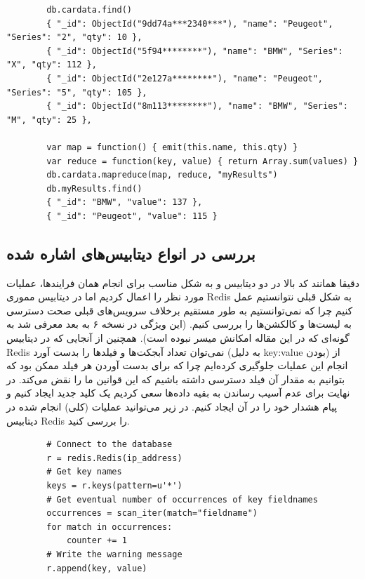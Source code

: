 \documentclass[10pt, a4paper]{article}
\begin{document}
\begin{LTR}
    \begin{lstlisting}
        db.cardata.find()
        { "_id": ObjectId("9dd74a***2340***"), "name": "Peugeot", "Series": "2", "qty": 10 },
        { "_id": ObjectId("5f94********"), "name": "BMW", "Series": "X", "qty": 112 },
        { "_id": ObjectId("2e127a********"), "name": "Peugeot", "Series": "5", "qty": 105 },
        { "_id": ObjectId("8m113********"), "name": "BMW", "Series": "M", "qty": 25 },

        var map = function() { emit(this.name, this.qty) }
        var reduce = function(key, value) { return Array.sum(values) } 
        db.cardata.mapreduce(map, reduce, "myResults")
        db.myResults.find()
        { "_id": "BMW", "value": 137 },
        { "_id": "Peugeot", "value": 115 }
    \end{lstlisting}
\end{LTR}

\subsection*{بررسی در انواع دیتابیس‌های اشاره شده}

دقیقا همانند کد بالا در دو دیتابیس  و  به شکل
مناسب برای انجام همان فرایند‌ها، عملیات مورد نظر را اعمال کردیم اما در دیتابیس
مموری Redis به شکل قبلی نتوانستیم عمل کنیم چرا که نمی‌توانستیم به طور مستقیم
برخلاف سرویس‌های قبلی صحت دسترسی به لیست‌ها و کالکشن‌ها را بررسی کنیم. (این
ویژگی در نسخه ۶ به بعد معرفی شد به گونه‌ای که در این مقاله امکانش میسر نبوده
است). همچنین از آنجایی که در دیتابیس Redis نمی‌توان تعداد آبجکت‌ها و فیلد‌ها را
بدست آورد (به دلیل key:value بودن) از انجام این عملیات جلوگیری کرده‌ایم چرا که
برای بدست آوردن هر فیلد ممکن بود که بتوانیم به مقدار آن فیلد دسترسی داشته باشیم
که این قوانین ما را نقض می‌کند. در نهایت برای عدم آسیب رساندن به بقیه داده‌ها
سعی کردیم یک کلید جدید ایجاد کنیم و پیام هشدار خود را در آن ایجاد کنیم. در زیر
می‌توانید عملیات (کلی) انجام شده در دیتابیس Redis را بررسی کنید.

\begin{LTR}
    \begin{lstlisting}
        # Connect to the database
        r = redis.Redis(ip_address)
        # Get key names
        keys = r.keys(pattern=u'*')
        # Get eventual number of occurrences of key fieldnames
        occurrences = scan_iter(match="fieldname")
        for match in occurrences:
            counter += 1
        # Write the warning message
        r.append(key, value)
    \end{lstlisting}
\end{LTR}
\end{document}
